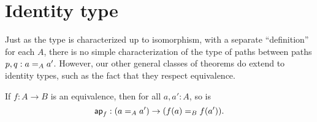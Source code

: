 %
%

\section{Identity type}
\label{sec:compute-paths}

%
Just as the type  is characterized up to isomorphism, with
a separate ``definition'' for each $A$, there is no simple
characterization of the type  of paths between
paths $p,q : \id[A]{a}{a'}$.
However, our other general classes of theorems do extend to identity types, such as the fact that they respect equivalence.

\begin{thm}\label{thm:paths-respects-equiv}
  If $f : A \to B$ is an equivalence, then for all $a,a':A$, so is
  \[\apfunc{f} : (\id[A]{a}{a'}) \to (\id[B]{f(a)}{f(a')}).\]
\end{thm}
